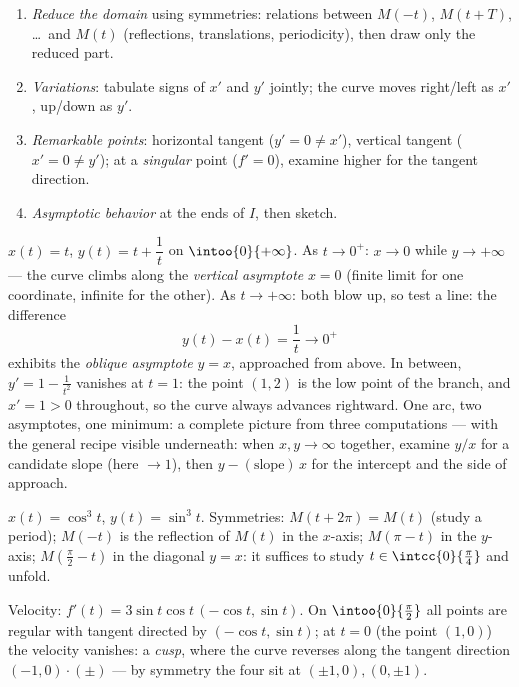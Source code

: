 \begin{method}\label{met:b1:curves:study}
\begin{enumerate}
  \item \emph{Reduce the domain} using symmetries: relations between
        $M(-t)$, $M(t + T)$, \dots\ and $M(t)$ (reflections,
        translations, periodicity), then draw only the reduced part.
  \item \emph{Variations}: tabulate signs of $x'$ and $y'$ jointly;
        the curve moves right/left as $x'$, up/down as $y'$.
  \item \emph{Remarkable points}: horizontal tangent ($y' = 0 \neq
        x'$), vertical tangent ($x' = 0 \neq y'$); at a
        \emph{singular} point ($f' = 0$), examine higher 
        for the tangent direction.
  \item \emph{Asymptotic behavior} at the ends of $I$, then sketch.
\end{enumerate}
\end{method}

\begin{example}
\label{ex:b1:curves:asymptotes}
$x(t) = t$, $y(t) = t + \dfrac1t$ on $\intoo{0}{+\infty}$. As $t
\to 0^{+}$: $x \to 0$ while $y \to +\infty$ --- the curve climbs
along the \emph{vertical asymptote} $x = 0$ (finite limit for
one coordinate, infinite for the other). As $t \to +\infty$:
both  blow up, so test a line: the difference
\[
y(t) - x(t) = \frac1t \longrightarrow 0^{+}
\]
exhibits the \emph{oblique asymptote} $y = x$, approached from
above. In between, $y' = 1 - \frac1{t^2}$ vanishes at $t = 1$:
the point $(1, 2)$ is the low point of the branch, and $x' = 1 >
0$ throughout, so the curve always advances rightward. One arc,
two asymptotes, one minimum: a complete picture from three
computations --- with the general recipe visible underneath:
when $x, y \to \infty$ together, examine $y/x$ for a candidate
slope (here $\to 1$), then $y - (\text{slope})\,x$ for the
intercept and the side of approach.
\end{example}

\begin{example}\label{ex:b1:curves:astroid}
$x(t) = \cos^3 t$, $y(t) = \sin^3 t$. Symmetries:
$M(t + 2\pi) = M(t)$ (study a period); $M(-t)$ is the reflection of
$M(t)$ in the $x$-axis; $M(\pi - t)$ in the $y$-axis; $M(\frac\pi2 -
t)$ in the diagonal $y = x$: it suffices to study $t \in
\intcc{0}{\frac\pi4}$ and unfold.

Velocity: $f'(t) = 3\sin t\cos t\,(-\cos t, \sin t)$. On
$\intoo{0}{\frac\pi2}$ all points are regular with tangent directed
by $(-\cos t, \sin t)$; at $t = 0$ (the point $(1,0)$) the velocity
vanishes: a \emph{cusp}, where the curve reverses along
the tangent direction $(-1, 0)\cdot(\pm)$ --- by symmetry the four
 sit at $(\pm1, 0), (0, \pm1)$.
\end{example}

